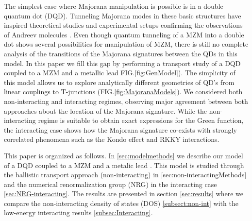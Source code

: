\documentclass[showpacs,aps,prb,reprint,superscriptaddress]{revtex4-1}
\begin{document}
 The simplest case where Majorana manipulation is possible is in a double quantum dot (DQD). Tunneling Majorana modes in these basic structures have inspired theoretical studies \cite{silva_andreev_2016,ivanov_coherent_2017} and experimental setups confirming the observations of Andreev molecules \cite{su_andreev_2017}. Even though quantum tunneling of a MZM into a double dot shows several possibilities for manipulation of MZM,  there is still no complete analysis of the transitions of the Majorana signatures between the QDs in this model. In this paper we fill this gap by performing a transport study of a DQD coupled to a MZM and a metallic lead FIG.\ref{fig:GenModel}). The simplicity of this model allows us to explore analytically different geometries of QD's from linear couplings to T-junctions (FIG.\ref{fig:MajoranaModels}). We considered both non-interacting and interacting regimes, observing major agreement between both approaches about the location of the Majorana signature. While the non-interacting regime is suitable to obtain exact expressions for the Green function, the interacting case  shows how the Majorana signature co-exists with strongly correlated phenomena such as the Kondo effect \cite{hewson_kondo_1997} and RKKY interactions.   \cite{ruderman_indirect_1954,kasuya_theory_1956,yosida_magnetic_1957} 

This paper is organized as follows. In \ref{sec:modelmethods} we describe our model of a DQD coupled to a MZM and a metalic lead . This model is studied through the ballistic transport \cite{zubarev_double-time_1960} approach (non-interacting) in \ref{sec:non-interactingMethods} and the numerical renormalization group (NRG)\cite{bulla_numerical_2008} in the interacting case \ref{sec:NRG-interacting}. The results are presented in section \ref{sec:results} where we compare the non-interacting density of states (DOS) \ref{subsect:non-int} with the low-energy  interacting results \ref{subsec:Interacting}. 


\end{document}
